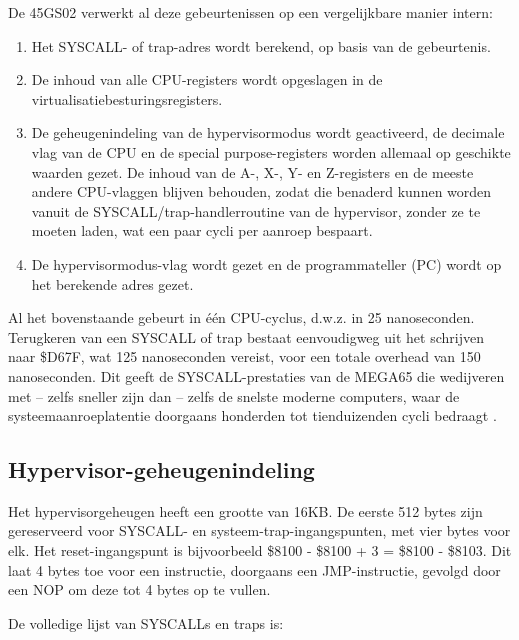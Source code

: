 De 45GS02 verwerkt al deze gebeurtenissen op een vergelijkbare manier intern:

\begin{enumerate}
\item Het SYSCALL- of trap-adres wordt berekend, op basis van de gebeurtenis.\item De inhoud van alle CPU-registers wordt opgeslagen in de virtualisatiebesturingsregisters.\item De geheugenindeling van de hypervisormodus wordt geactiveerd, de decimale vlag van de CPU en de special purpose-registers worden allemaal op geschikte waarden gezet.  De inhoud van de A-, X-, Y- en Z-registers en de meeste andere CPU-vlaggen blijven behouden, zodat die benaderd kunnen worden vanuit de SYSCALL/trap-handlerroutine van de hypervisor, zonder ze te moeten laden, wat een paar cycli per aanroep bespaart.\item De hypervisormodus-vlag wordt gezet en de programmateller (PC) wordt op het berekende adres gezet.
\end{enumerate}

Al het bovenstaande gebeurt in één CPU-cyclus, d.w.z. in 25 nanoseconden. Terugkeren van een SYSCALL of trap bestaat eenvoudigweg uit het schrijven naar \$D67F, wat 125 nanoseconden vereist, voor een totale overhead van 150 nanoseconden. Dit geeft de SYSCALL-prestaties van de MEGA65 die wedijveren met -- zelfs sneller zijn dan -- zelfs de snelste moderne computers, waar de systeemaanroeplatentie doorgaans honderden tot tienduizenden cycli bedraagt \cite{soares2010flexsc}.

\subsection{Hypervisor-geheugenindeling}

Het hypervisorgeheugen heeft een grootte van 16KB. De eerste 512 bytes zijn gereserveerd voor SYSCALL- en systeem-trap-ingangspunten, met vier bytes voor elk. Het reset-ingangspunt is bijvoorbeeld \$8100 - \$8100 + 3 = \$8100 - \$8103. Dit laat 4 bytes toe voor een instructie, doorgaans een JMP-instructie, gevolgd door een NOP om deze tot 4 bytes op te vullen.

De volledige lijst van SYSCALLs en traps is:

